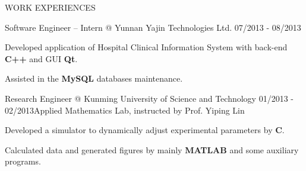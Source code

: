 \documentclass{resume} %
\begin{document}
\begin{rSection}{WORK EXPERIENCES}
\begin{rSubsection}{Software Engineer – Intern    @    Yunnan Yajin Technologies Ltd. }{07/2013 - 08/2013} {} {} 
\item Developed application of Hospital Clinical Information System with back-end {\bf C++} and GUI {\bf Qt}. 
\item Assisted in the {\bf MySQL} databases maintenance.
\end{rSubsection}
\begin{rSubsection}{Research Engineer    @    Kunming University of Science and Technology}{ 01/2013 - 02/2013}{Applied Mathematics Lab, instructed by Prof. Yiping Lin } {}
 \item Developed a simulator to dynamically adjust experimental parameters by {\bf C}.
 \item Calculated data and generated figures by mainly {\bf MATLAB} and some auxiliary programs.
\end{rSubsection}
\end{rSection}
\end{document}
